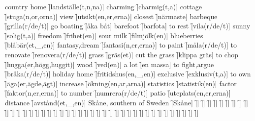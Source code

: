 \begin{questions}
    \begin{multicols}{2}
        \raggedcolumns
        \question country home \f[landställe(t,n,na)]
        \question charming \f[charmig(t,a)]
        \question cottage \f[stuga(n,or,orna)]
        \question view \f[utsikt(en,er,erna)]
        \question closest \f[närmaste]
        \question barbeque \f[grilla(r/de/t)]
        \question go boating \f[åka båt]
        \question barefoot \f[barfota]
        \question to rest \f[vila(r/de/t)]
        \question sunny \f[solig(t,a)]
        \question freedom \f[frihet(en)]
        \question sour milk \f[filmjölk(en)]
        \question blueberries \f[blåbär(et,\_,en)]
        \question fantasy,dream \f[fantasi(n,er,erna)]
        \question to paint \f[måla(r/de/t)]
        \question to renovate \f[renovera(r/de/t)]
        \question grass \f[gräs(et)]
        \question cut the grass \f[klippa gräs]
        \question to chop \f[hugga(er,högg,huggit)]
        \question wood \f[ved(en)]
        \question a lot \f[en massa]
        \question to fight,argue \f[bråka(r/de/t)]
        \question holiday home \f[fritidshus(en,\_,en)]
        \question exclusive \f[exklusiv(t,a)]
        \question to own \f[äga(er,ägde,ägt)]
        \question increase \f[ökning(en,ar,arna)]
        \question statistics \f[statistik(en)]
        \question factor \f[faktor(n,er,erna)]
        \question to number \f[numrera(r/de/t)]
        \question patio \f[uteplats(en,er,erna)]
        \question distance \f[avstånd(et,\_,en)]
        \question Skåne, southern of Sweden \f[Skåne]
        \question  \f[]
        \question  \f[]
        \question  \f[]
        \question  \f[]
        \question  \f[]
        \question  \f[]
        \question  \f[]
        \question  \f[]
        \question  \f[]
        \question  \f[]
        \question  \f[]
        \question  \f[]
        \question  \f[]
        \question  \f[]
        \question  \f[]
        \question  \f[]
        \question  \f[]
        \question  \f[]
        \question  \f[]
        \question  \f[]
        \question  \f[]
        \question  \f[]
        \question  \f[]
        \question  \f[]
        \question  \f[]
        \question  \f[]
        \question  \f[]
        \question  \f[]
        \question  \f[]
        \question  \f[]
        \question  \f[]
        \question  \f[]
        \question  \f[]
        \question  \f[]
        \question  \f[]
        \question  \f[]
        \question  \f[]
        \question  \f[]
        \question  \f[]
        \question  \f[]
        \question  \f[]

\end{multicols}
\end{questions}
